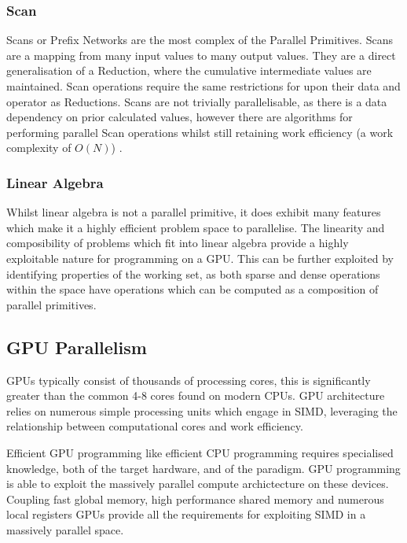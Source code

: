 \FloatBarrier
\subsubsection{Scan}

Scans or Prefix Networks are the most complex of the Parallel Primitives. Scans are a mapping from
many input values to many output values. They are a direct generalisation of a Reduction, where the
cumulative intermediate values are maintained. Scan operations require the same restrictions for upon their data and operator as Reductions. Scans are not trivially parallelisable, as there is a data dependency on
prior calculated values, however there are algorithms for performing parallel Scan operations whilst
still retaining work efficiency (a work complexity of $ O(N) $) \cite{ScanOp}.

\FloatBarrier
\subsubsection{Linear Algebra}
Whilst linear algebra is not a parallel primitive, it does exhibit many features which make it a
highly efficient problem space to parallelise. The linearity and composibility of problems which fit
into linear algebra provide a highly exploitable nature for programming on a GPU. This can be
further exploited by identifying properties of the working set, as both sparse and dense operations
within the space have operations which can be computed as a composition of parallel
primitives\cite{gallivan1990parallel}. 

\FloatBarrier
\subsection{GPU Parallelism}
GPUs typically consist of thousands of processing cores, this is significantly greater than the
common 4-8 cores found on modern CPUs. GPU architecture relies on numerous simple processing units
which engage in SIMD, leveraging the relationship between computational cores and work efficiency.


Efficient GPU programming like efficient CPU programming requires specialised knowledge, both of the
target hardware, and of the paradigm. GPU programming is able to exploit the massively parallel
compute archictecture on these devices. Coupling fast global memory, high performance shared memory
and numerous local registers GPUs provide all the requirements for exploiting SIMD in a massively
parallel space.




